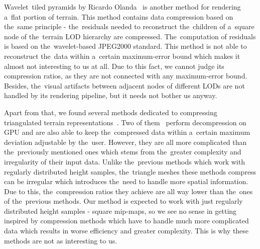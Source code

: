  Wavelet~tiled pyramids by Ricardo Olanda~\cite{jpeg2000terrain} is another method for rendering a~flat portion of terrain. This method contains data compression based on the~same principle - the~residuals needed to reconstruct the~children of a~square node of the~terrain LOD hierarchy are compressed. The~computation of residuals is based on the~wavelet-based JPEG2000 standard. This method is not able to reconstruct the~data within a~certain maximum-error bound which makes it almost not interesting to us at all. Due to this fact, we cannot judge its compression ratios, as they are not connected with any maximum-error bound. Besides, the~visual artifacts between adjacent nodes of different LODs are not handled by its rendering pipeline, but it needs not bother us anyway.
 
 Apart from that, we found several methods dedicated to compressing triangulated terrain representations~\cite{meshesGPU1, meshesGPU2, meshes}. Two of them~\cite{meshesGPU1, meshesGPU2} perform decompression on GPU and are also able to keep the~compressed data within a~certain maximum deviation adjustable by the~user. However, they are all more complicated than the~previously mentioned ones which stems from the~greater complexity and irregularity of their input data. Unlike the~previous methods which work with regularly distributed height samples, the~triangle meshes these methods compress can be irregular which introduces the~need to handle more spatial information. Due to this, the~compression ratios they achieve are all way lower than the~ones of the~previous methods. Our method is expected to work with just regularly distributed height samples - square mip-maps, so we see no sense in getting inspired by compression methods which have to handle much more complicated data which results in worse efficiency and greater complexity. This is why these methods are not as interesting to us.
 
